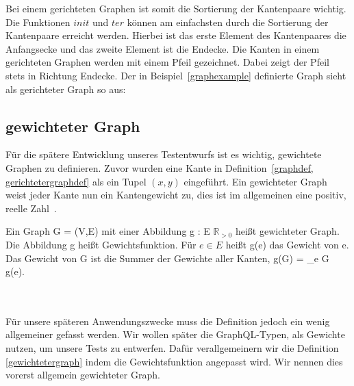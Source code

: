 Bei einem gerichteten Graphen ist somit die Sortierung der Kantenpaare wichtig.
Die Funktionen $init$ und $ter$ können am einfachsten durch die Sortierung der Kantenpaare erreicht werden.
Hierbei ist das erste Element des Kantenpaares die Anfangsecke und das zweite Element ist die Endecke.
Die Kanten in einem gerichteten Graphen werden mit einem Pfeil gezeichnet.
Dabei zeigt der Pfeil stets in Richtung Endecke.
Der in Beispiel~\ref{graphexample} definierte Graph sieht als gerichteter Graph so aus:
\begin{center}
\end{center}

\subsection{gewichteter Graph}

Für die spätere Entwicklung unseres Testentwurfs ist es wichtig, gewichtete Graphen zu definieren.
Zuvor wurden eine Kante in Definition~\ref{graphdef, gerichtetergraphdef} als ein Tupel $(x, y)$ eingeführt.
Ein gewichteter Graph weist jeder Kante nun ein Kantengewicht zu, dies ist im allgemeinen eine positiv, reelle Zahl~\cite[vgl. S. 251]{graphentheorie3}.

\begin{definition}
    Ein Graph G = (V,E) mit einer Abbildung g : E \textrightarrow $\mathbb{R}_{>0}$ heißt gewichteter Graph.
    Die Abbildung g heißt Gewichtsfunktion. Für $e \in E$ heißt g(e) das Gewicht von e.
    Das Gewicht von G ist die Summer der Gewichte aller Kanten, g(G) = \sum_{e \in G} g(e).\\
    \cite[vgl.~Definition~6.1~S.~251]{graphentheorie3}
    \label{gewichtetergraph}
\end{definition}
\\
\\
Für unsere späteren Anwendungszwecke muss die Definition jedoch ein wenig allgemeiner gefasst werden. 
Wir wollen später die GraphQL-Typen, als Gewichte nutzen, um unsere Tests zu entwerfen. 
Dafür verallgemeinern wir die Definition \ref{gewichtetergraph} indem die Gewichtsfunktion angepasst wird.
Wir nennen dies vorerst allgemein gewichteter Graph.

